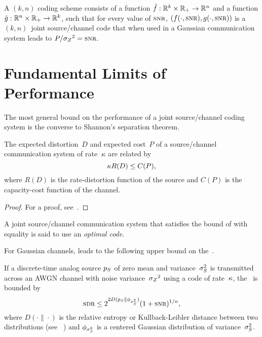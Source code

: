 \begin{definition}
  \label{def:codingscheme}
  A $(k,n)$ coding scheme consists of a function $\tilde{f} : \mathbb{R}^k \times \mathbb{R}_+
  \rightarrow \mathbb{R}^n$ and a function $\tilde{g}: \mathbb{R}^n \times \mathbb{R}_+ \rightarrow \mathbb{R}^k$, such that for
  every value of $\snr$, $(f(\cdot, \snr), g(\cdot, \snr))$ is a $(k,n)$~joint
  source/channel code that when used in a Gaussian communication system leads to
  $P/\szq = \snr$.
\end{definition}


\section{Fundamental Limits of Performance}
\label{sec:limits}

The most general bound on the performance of a joint source/channel coding
system is the converse to Shannon's separation theorem.

\begin{theorem}
  \label{thm:sepconverse}
  The expected distortion~$D$ and expected cost~$P$ of a source/channel
  communication system of rate~$\kappa$ are related by
  \begin{equation}
    \label{eq:sepconverse}
    \kappa R(D) \le C(P), 
  \end{equation}
  where $R(D)$ is the rate-distortion function of the source and $C(P)$ is the
  capacity-cost function of the channel.
\end{theorem}

\begin{proof}
  For a proof, see~\cite[Theorem~9.6.1]{Gallager1968}.
\end{proof}

\begin{definition}
  \label{def:optimalcode}
  A joint source/channel communication system that satisfies the bound of
   with equality is said to use an \emph{optimal code}.
\end{definition}

For Gaussian channels,  leads to the following upper bound
on the~\sdr.
\begin{theorem}
  \label{thm:sdrub}
  If a discrete-time analog source ${p_S}$ of zero mean and variance~${\sigma_S^2}$ is
  transmitted across an AWGN channel with noise variance~${{\sigma_Z}^2}$ using a code of
  rate~$\kappa$, the \sdr\ is bounded by
  \begin{equation}
    \label{eq:sdrub}
    \sdr \le 2^{2 D(\pS \| \phi_{\ssq})} (1 + \snr)^{1/\k},
  \end{equation}
  where $D(\cdot \| \cdot)$ is the relative entropy or Kullback-Leibler distance
  between two distributions (see \eg~\cite{CoverT1991}) and $\phi_{{\sigma_S^2}}$ is a
  centered Gaussian distribution of variance~${\sigma_S^2}$.
\end{theorem}

